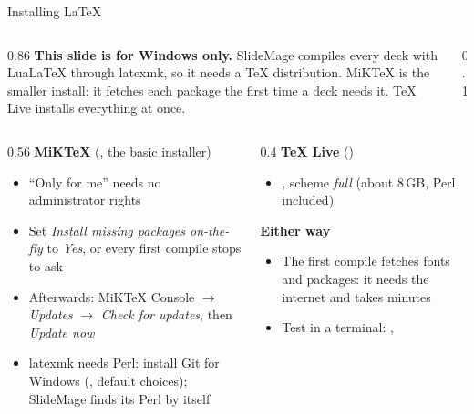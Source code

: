 

\begin{standardframe}{Installing LaTeX}
	\small
	\begin{columns}[c,onlytextwidth]
		\begin{column}{0.86\linewidth}
			\textbf{This slide is for Windows only.}
			SlideMage compiles every deck with LuaLaTeX through latexmk, so it needs a
			TeX distribution. MiKTeX is the smaller install: it fetches each
			package the first time a deck needs it. TeX Live installs everything at once.
		\end{column}
		\begin{column}{0.1\linewidth}
			\ifdefined\faWindows\raggedleft{\fontsize{34}{34}\selectfont\faWindows}\fi
		\end{column}
	\end{columns}
	\par
	\begin{columns}[T,onlytextwidth]
		\begin{column}{0.56\linewidth}
			\textbf{MiKTeX} (, the basic installer)
			\begin{itemize}
				\item ``Only for me'' needs no administrator rights
				\item Set \emph{Install missing packages on-the-fly} to \emph{Yes}, or every first compile stops to ask
				\item Afterwards: MiKTeX Console $\rightarrow$ \emph{Updates} $\rightarrow$ \emph{Check for updates}, then \emph{Update now}
				\item latexmk needs Perl: install Git for Windows (, default choices); SlideMage finds its Perl by itself
			\end{itemize}
		\end{column}
		\begin{column}{0.4\linewidth}
			\textbf{TeX Live} ()
			\begin{itemize}
				\item {}, scheme \emph{full} (about 8\,GB, Perl included)
			\end{itemize}
			\smallskip
			\textbf{Either way}
			\begin{itemize}
				\item The first compile fetches fonts and packages: it needs the internet and takes minutes
				\item Test in a terminal: , 
			\end{itemize}
		\end{column}
	\end{columns}
\end{standardframe}
